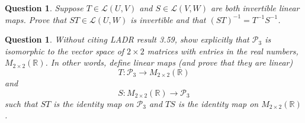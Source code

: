\documentclass[12pt]{article}
\newtheorem{question}[thm]{Question}
\def\real{{\mathbb R}}
\def\P{\mathcal P}
\begin{document}
\vspace{.5cm}

\begin{question}
	\normalfont
	
	Suppose $T \in \mathcal{L}(U,V)$ and $S \in \mathcal{L}(V,W)$ are both invertible linear maps. Prove that $ST \in \mathcal{L}(U,W)$ is invertible and that $(ST)^{-1} = T^{-1}S^{-1}$. 
	
	
	\end{question}







\vspace{.5cm}

\begin{question}
\normalfont
\noindent Without citing LADR result 3.59, show explicitly that  $\P_3$ is isomorphic to the vector space of $2\times2$ matrices with entries in the real numbers, $M_{2\times 2}(\real)$. In other words, define linear maps (and prove that they are linear)
\[
T: \P_3 \to M_{2\times2}(\real)
\]
and 
\[
S: M_{2\times2}(\real) \to \P_3
\]
such that $ST$ is the identity map on $\P_3$ and $TS$ is the identity map on $M_{2\times2}(\real)$.  \\ 


\end{question}




\vspace{.5cm}
\end{document}
